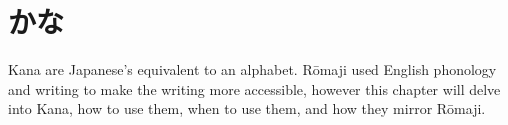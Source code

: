 \chapter[かな]{かな}\label{chp:N6;かな}

Kana are Japanese's equivalent to an alphabet. R\=omaji used English phonology and writing to make the writing more accessible, however this chapter will delve into Kana, how to use them, when to use them, and how they mirror R\=omaji.



